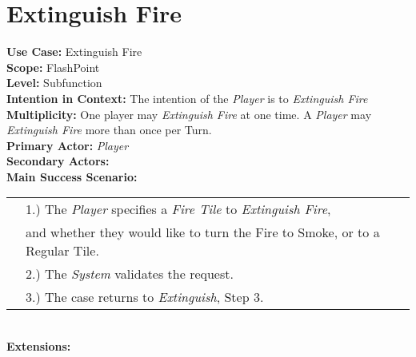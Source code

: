 \documentclass{article}
\begin{document}
	\section*{Extinguish Fire}
	\textbf{Use Case:} Extinguish Fire\\
	\textbf{Scope:} FlashPoint\\
	\textbf{Level:} Subfunction\\
	\textbf{Intention in Context:} The intention of the \textit{Player} is to \textit{Extinguish Fire} \\
	\textbf{Multiplicity: } One player may \textit{Extinguish Fire} at one time. A \textit{Player} may \textit{Extinguish Fire} more than once per Turn.\\
	\textbf{Primary Actor:} \textit{Player}\\
	\textbf{Secondary Actors:}\\
	\textbf{Main Success Scenario:}\\
	\begin{tabular}{l l}
		&1.) The \textit{Player} specifies a \textit{Fire Tile} to \textit{Extinguish Fire},\\
		&\qquad and whether they would like to turn the Fire to Smoke, or to a Regular Tile.\\
		&2.) The \textit{System} validates the request.\\
		&3.) The case returns to \textit{Extinguish}, Step 3.\\
	\end{tabular}\\
	\textbf{Extensions:}\\
\end{document}
